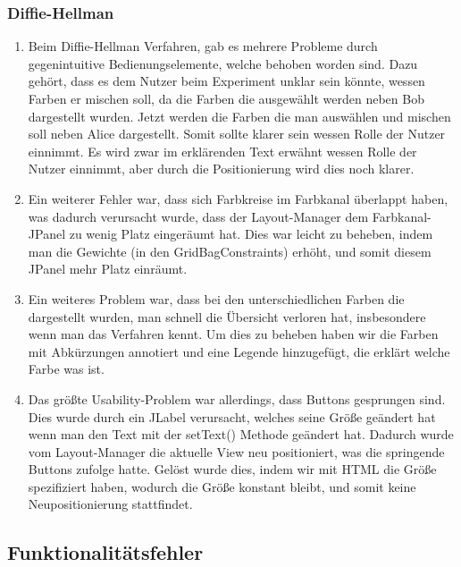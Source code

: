 \documentclass{article}
\begin{document}
     \subsubsection{Diffie-Hellman}
     \begin{enumerate}
         \item Beim Diffie-Hellman Verfahren, gab es mehrere Probleme durch gegenintuitive Bedienungselemente, welche behoben worden sind.
             Dazu gehört, dass es dem Nutzer beim Experiment unklar sein könnte, wessen Farben er mischen soll,
             da die Farben die ausgewählt werden neben Bob dargestellt wurden. Jetzt werden die Farben
             die man auswählen und mischen soll neben Alice dargestellt. Somit sollte klarer sein wessen Rolle
             der Nutzer einnimmt.
             Es wird zwar im erklärenden Text erwähnt wessen Rolle der Nutzer einnimmt, aber durch die Positionierung
             wird dies noch klarer.
         \item Ein weiterer Fehler war, dass sich Farbkreise im Farbkanal überlappt haben,
             was dadurch verursacht wurde, dass der Layout-Manager dem Farbkanal-JPanel zu wenig Platz eingeräumt hat.
             Dies war leicht zu beheben, indem man die Gewichte (in den GridBagConstraints) erhöht,
             und somit diesem JPanel mehr Platz einräumt.
         \item Ein weiteres Problem war, dass bei den unterschiedlichen Farben die dargestellt wurden,
             man schnell die Übersicht verloren hat, insbesondere wenn man das Verfahren kennt.
             Um dies zu beheben haben wir die Farben mit Abkürzungen annotiert und eine Legende hinzugefügt,
             die erklärt welche Farbe was ist.
         \item Das größte Usability-Problem war allerdings, dass Buttons gesprungen sind.
             Dies wurde durch ein JLabel verursacht, welches seine Größe geändert hat
             wenn man den Text mit der setText() Methode geändert hat.
             Dadurch wurde vom Layout-Manager die aktuelle View neu positioniert, was die springende Buttons
             zufolge hatte.
             Gelöst wurde dies, indem wir mit HTML die Größe spezifiziert haben, wodurch die Größe konstant bleibt,
             und somit keine Neupositionierung stattfindet.
     \end{enumerate}

     \subsection{Funktionalitätsfehler}
\end{document}
